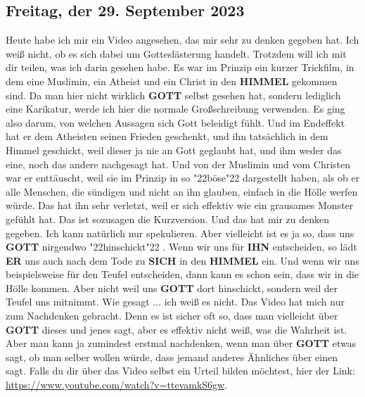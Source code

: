 \documentclass[12pt,a5paper]{article}
\newcommand{\Er}[0]{\textbf{ER}}
\newcommand{\Gott}[0]{\textbf{GOTT}}
\newcommand{\Himmel}[0]{\textbf{HIMMEL}}
\newcommand{\Ihn}[0]{\textbf{IHN}}
\newcommand{\Sich}[0]{\textbf{SICH}}
\newcommand{\q}[1]{\char"22{#1}\char"22 }
\begin{document}
	\subsection{Freitag, der 29. September 2023}
		Heute habe ich mir ein Video angesehen,
		das mir sehr zu denken gegeben hat.
		Ich wei{\ss} nicht,
		ob es sich dabei um Gottesl\"asterung handelt.
		Trotzdem will ich mit dir teilen,
		was ich darin gesehen habe.
		Es war im Prinzip ein kurzer Trickfilm,
		in dem eine Muslimin,
		ein Atheist und ein Christ in den {\Himmel} gekommen sind.
		Da man hier nicht wirklich {\Gott} selbst gesehen hat,
		sondern lediglich eine Karikatur,
		werde ich hier die normale Gro{\ss}schreibung verwenden.
		Es ging also darum,
		von welchen Aussagen sich Gott beleidigt f\"uhlt.
		Und im Endeffekt hat er dem Atheisten seinen Frieden geschenkt,
		und ihn tats\"achlich in dem Himmel geschickt,
		weil dieser ja nie an Gott geglaubt hat,
		und ihm weder das eine,
		noch das andere nachgesagt hat.
		Und von der Muslimin und vom Christen war er entt\"auscht,
		weil sie im Prinzip in so \q{b\"ose} dargestellt haben,
		als ob er alle Menschen,
		die s\"undigen und nicht an ihn glauben,
		einfach in die H\"olle werfen w\"urde.
		Das hat ihn sehr verletzt,
		weil er sich effektiv wie ein grausames Monster gef\"uhlt hat.
		Das ist sozusagen die Kurzversion.
		Und das hat mir zu denken gegeben.
		Ich kann nat\"urlich nur spekulieren.
		Aber vielleicht ist es ja so,
		dass uns {\Gott} nirgendwo \q{hinschickt}.
		Wenn wir uns f\"ur {\Ihn} entscheiden,
		so l\"adt {\Er} uns auch nach dem Tode zu {\Sich} in den {\Himmel} ein.
		Und wenn wir uns beispielsweise f\"ur den Teufel entscheiden,
		dann kann es schon sein,
		dass wir in die H\"olle kommen.
		Aber nicht weil uns {\Gott} dort hinschickt,
		sondern weil der Teufel uns mitnimmt.
		Wie gesagt ... ich wei{\ss} es nicht.
		Das Video hat mich nur zum Nachdenken gebracht.
		Denn es ist sicher oft so,
		dass man vielleicht \"uber {\Gott} dieses und jenes sagt,
		aber es effektiv nicht wei{\ss},
		was die Wahrheit ist.
		Aber man kann ja zumindest erstmal nachdenken,
		wenn man \"uber {\Gott} etwas sagt,
		ob man selber wollen w\"urde,
		dass jemand anderes \"Ahnliches \"uber einen sagt.
		Falls du dir \"uber das Video selbst ein Urteil bilden m\"ochtest,
		hier der Link: \url{https://www.youtube.com/watch?v=ttevamkS6gw}.
\end{document}
